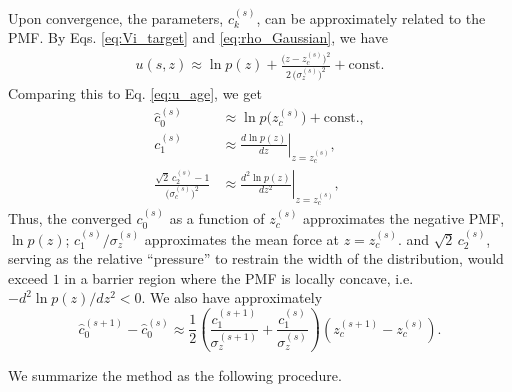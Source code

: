 \documentclass[reprint, superscriptaddress, floatfix]{revtex4-1}
\begin{document}
Upon convergence,
the parameters, $c_k^{(s)}$,
can be approximately related to the PMF.
By Eqs. \eqref{eq:Vi_target} and \eqref{eq:rho_Gaussian}, we have
\begin{align*}
  u(s, z)
  \approx
  \ln p(z)
  +
  \frac{ \bigl(z - z_c^{(s)} \bigr)^2 }
  { 2 \, \bigl( \sigma_z^{(s)} \bigr)^2 }
  +
  \mathrm{const.}
\end{align*}
%
Comparing this to Eq. \eqref{eq:u_age}, we get
\begin{align*}
  \hat c_0^{(s)}
  &\approx \ln p\bigl(z_c^{(s)}\bigr) + \mathrm{const.}
  ,
  \\
  c_1^{(s)}
  &\approx \left. \frac{d \ln p(z) } { d z } \right|_{z = z_c^{(s)}}
  ,
  \\
  \frac{
    \sqrt 2 \, c_2^{(s)} - 1
  } { \bigl( \sigma_c^{(s)} \bigr)^2 }
  &\approx \left. \frac{d^2 \ln p(z) } { d z^2 } \right|_{z = z_c^{(s)}}
  ,
\end{align*}
%
Thus,
the converged $c_0^{(s)}$ as a function of $z_c^{(s)}$
approximates the negative PMF, $\ln p(z)$;\cite{maragliano2006, *abrams2008}
$c_1^{(s)}/\sigma_z^{(s)}$
approximates the mean force at $z = z_c^{(s)}$.
%
and $\sqrt{2} \, c_2^{(s)}$,
serving as the relative ``pressure''
to restrain the width of the distribution,
would exceed $1$ in a barrier region
where the PMF is locally concave,
i.e. $-d^2\ln p(z)/dz^2 < 0$.
%
%
We also have approximately\cite{park2007, *nguyen2013, *zhang2015st}
\begin{equation}
  \hat c_0^{(s+1)} - \hat c_0^{(s)}
  \approx
  \frac{1}{2}\left(
    \frac{ c_1^{(s+1)} } { \sigma_z^{(s+1)} }
    +
    \frac{ c_1^{(s)} } { \sigma_z^{(s)} }
  \right)
  \left(
  z_c^{(s+1)} - z_c^{(s)}
  \right)
  .
  \label{eq:c0_est}
\end{equation}
%
%


We summarize the method as the following procedure.
\end{document}
